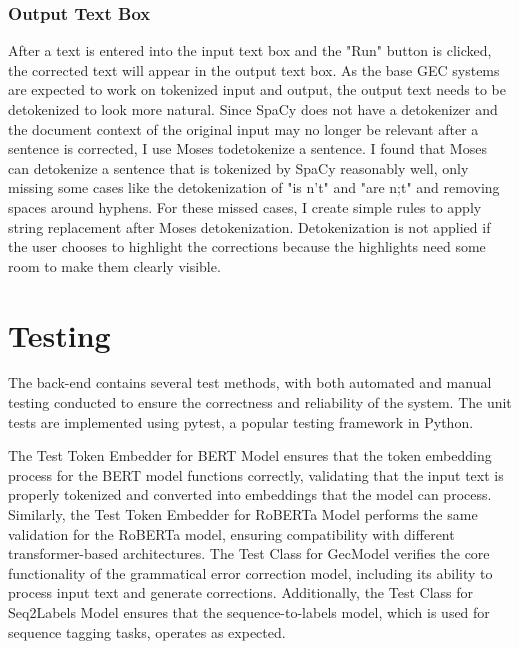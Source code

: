 \subsubsection{Output Text Box}

After a text is entered into the input text box and the "Run" button is clicked, the corrected text will appear in the output text box.
As the base GEC systems are expected to work on tokenized input and output, the output text needs to be detokenized to look more natural.
Since SpaCy does not have a detokenizer and the document context of the original input may no longer be relevant after a sentence is corrected, I use Moses todetokenize a sentence.
I found that Moses can detokenize a sentence that is tokenized by SpaCy reasonably well, only missing some cases like the detokenization of "is n't" and "are n;t" and removing spaces around hyphens.
For these missed cases, I create simple rules to apply string replacement after Moses detokenization.
Detokenization is not applied if the user chooses to highlight the corrections because the highlights need some room to make them clearly visible.

\section{Testing}

The back-end contains several test methods, with both automated and manual testing conducted to ensure the correctness and reliability of the system.
The unit tests are implemented using pytest, a popular testing framework in Python.

%

The Test Token Embedder for BERT Model ensures that the token embedding process for the BERT model functions correctly, validating that the input text is properly tokenized and converted into embeddings that the model can process.
Similarly, the Test Token Embedder for RoBERTa Model performs the same validation for the RoBERTa model, ensuring compatibility with different transformer-based architectures.
The Test Class for GecModel verifies the core functionality of the grammatical error correction model, including its ability to process input text and generate corrections.
Additionally, the Test Class for Seq2Labels Model ensures that the sequence-to-labels model, which is used for sequence tagging tasks, operates as expected.


